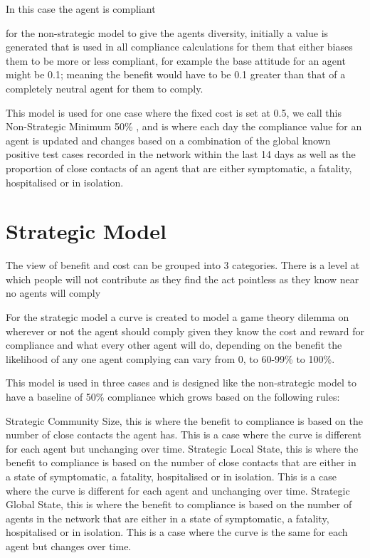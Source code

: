\documentclass{article}
\begin{document}
In this case the agent is compliant

for the non-strategic model to give the agents diversity, initially a value is generated that is used in all compliance calculations for them that either biases them to be more or less compliant, for example the base attitude for an agent might be 0.1; meaning the benefit would have to be 0.1 greater than that of a completely neutral agent for them to comply.\newline

This model is used for one case where the fixed cost is set at 0.5, we call this Non-Strategic Minimum 50\% , and is where each day the compliance value for an agent is updated and changes based on a combination of the global known positive test cases recorded in the network within the last 14 days as well as the proportion of close contacts of an agent that are either symptomatic, a fatality, hospitalised or in isolation.\newline


\section{Strategic Model}
The view of benefit and cost can be grouped into 3 categories.
There is a level at which people will not contribute as they find the act pointless as they know near no agents will comply 

For the strategic model a curve is created to model a game theory dilemma on wherever or not the agent should comply given they know the cost and reward for compliance and what every other agent will do, depending on the benefit the likelihood of any one agent complying can vary from 0, to 60-99\% to 100\%.

This model is used in three cases and is designed like the non-strategic model to have a baseline of 50\% compliance which grows based on the following rules:\newline

Strategic Community Size, this is where the benefit to compliance is based on the number of close contacts the agent has. This is a case where the curve is different for each agent but unchanging over time.\newline\newline
Strategic Local State, this is where the benefit to compliance is based on the number of close contacts that are either in a state of symptomatic, a fatality, hospitalised or in isolation. This is a case where the curve is different for each agent and unchanging over time.\newline\newline
Strategic Global State, this is where the benefit to compliance is based on the number of agents in the network that are either in a state of symptomatic, a fatality, hospitalised or in isolation. This is a case where the curve is the same for each agent but changes over time.
\end{document}
